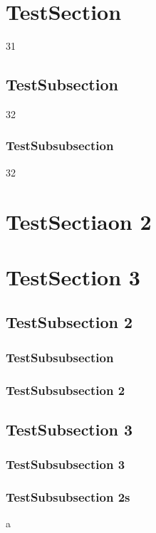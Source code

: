 \documentclass[8pt, a4paper, twoside]{extarticle}
\begin{document}
        \section{TestSection}{31}
        \subsection{TestSubsection}{32}
        \subsubsection{TestSubsubsection}{32}
        \section{TestSectiaon 2}
        \newpage
        \section{TestSection 3}
        \subsection{TestSubsection 2}
        \subsubsection{TestSubsubsection}
        \subsubsection{TestSubsubsection 2}
        \subsection{TestSubsection 3}
        \subsubsection{TestSubsubsection 3}
        \newpage
        \subsubsection{TestSubsubsection 2s}
        a
\end{document}
